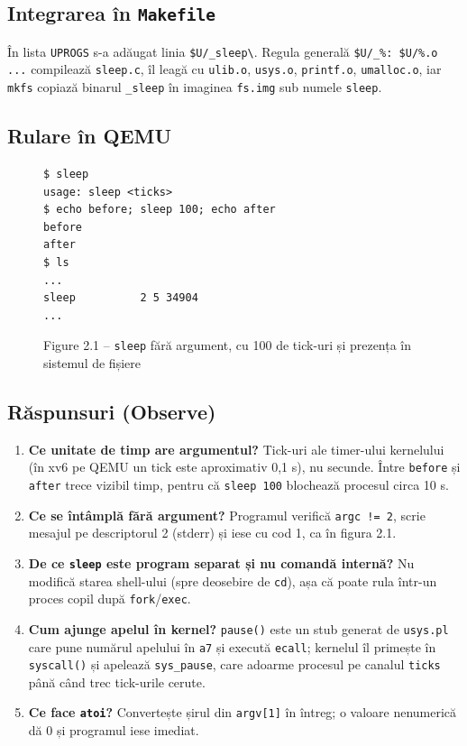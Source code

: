 \documentclass[12pt,a4paper]{article}
\begin{document}
\subsection{Integrarea în \texttt{Makefile}}
În lista \texttt{UPROGS} s-a adăugat linia \verb|$U/_sleep\|. Regula generală \verb|$U/_%: $U/%.o ...| compilează \texttt{sleep.c}, îl leagă cu \texttt{ulib.o}, \texttt{usys.o}, \texttt{printf.o}, \texttt{umalloc.o}, iar \texttt{mkfs} copiază binarul \texttt{\_sleep} în imaginea \texttt{fs.img} sub numele \texttt{sleep}.

\subsection{Rulare în QEMU}
\begin{figure}[h!]
\begin{lstlisting}
$ sleep
usage: sleep <ticks>
$ echo before; sleep 100; echo after
before
after
$ ls
...
sleep          2 5 34904
...
\end{lstlisting}
\caption{Figure 2.1 -- \texttt{sleep} fără argument, cu 100 de tick-uri și prezența în sistemul de fișiere}
\end{figure}

\subsection{Răspunsuri (Observe)}
\begin{enumerate}
    \item \textbf{Ce unitate de timp are argumentul?} Tick-uri ale timer-ului kernelului (în xv6 pe QEMU un tick este aproximativ 0,1 s), nu secunde. Între \texttt{before} și \texttt{after} trece vizibil timp, pentru că \texttt{sleep 100} blochează procesul circa 10 s.
    \item \textbf{Ce se întâmplă fără argument?} Programul verifică \texttt{argc != 2}, scrie mesajul pe descriptorul 2 (stderr) și iese cu cod 1, ca în figura 2.1.
    \item \textbf{De ce \texttt{sleep} este program separat și nu comandă internă?} Nu modifică starea shell-ului (spre deosebire de \texttt{cd}), așa că poate rula într-un proces copil după \texttt{fork}/\texttt{exec}.
    \item \textbf{Cum ajunge apelul în kernel?} \texttt{pause()} este un stub generat de \texttt{usys.pl} care pune numărul apelului în \texttt{a7} și execută \texttt{ecall}; kernelul îl primește în \texttt{syscall()} și apelează \texttt{sys\_pause}, care adoarme procesul pe canalul \texttt{ticks} până când trec tick-urile cerute.
    \item \textbf{Ce face \texttt{atoi}?} Convertește șirul din \texttt{argv[1]} în întreg; o valoare nenumerică dă 0 și programul iese imediat.
\end{enumerate}
\end{document}
